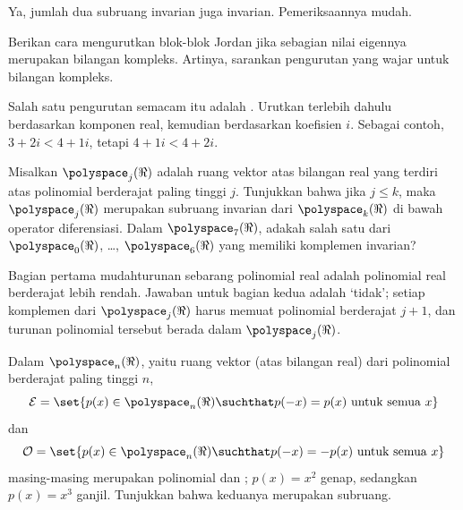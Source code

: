 \begin{exercises}
\begin{answer}
      Ya, jumlah dua subruang invarian juga invarian.
      Pemeriksaannya mudah.
    \end{answer}
  \item  \label{exer:OrderC}
     Berikan cara mengurutkan blok-blok Jordan jika sebagian nilai eigennya
     merupakan bilangan kompleks.
     Artinya, sarankan pengurutan yang wajar untuk bilangan kompleks.
     \begin{answer}
       Salah satu pengurutan semacam itu adalah .
       Urutkan terlebih dahulu berdasarkan komponen real, kemudian berdasarkan koefisien \( i \).
       Sebagai contoh, \( 3+2i<4+1i \), tetapi \( 4+1i<4+2i \).
     \end{answer}
  \item
    Misalkan \( \polyspace_j(\Re) \) adalah ruang vektor atas bilangan
    real yang terdiri atas polinomial berderajat paling tinggi \( j \).
    Tunjukkan bahwa jika \( j\le k \), maka \( \polyspace_j(\Re) \) merupakan
    subruang invarian dari \( \polyspace_k(\Re) \) di bawah operator diferensiasi.
    Dalam \( \polyspace_7(\Re) \), adakah salah satu dari \( \polyspace_0(\Re) \),
    \ldots, \( \polyspace_6(\Re) \) yang memiliki komplemen invarian?
    \begin{answer}
     Bagian pertama mudah\Dash turunan sebarang polinomial real adalah
      polinomial real berderajat lebih rendah.
      Jawaban untuk bagian kedua adalah `tidak'; setiap komplemen dari
      \( \polyspace_j(\Re) \) harus memuat polinomial berderajat \( j+1 \),
      dan turunan polinomial tersebut berada dalam \( \polyspace_j(\Re)\).
     \end{answer}
  \item
    Dalam \( \polyspace_n(\Re) \), yaitu ruang vektor (atas bilangan
    real) dari polinomial berderajat paling tinggi \( n \),
    \begin{equation*}
      \mathcal{E}=
      \set{p(x)\in\polyspace_n(\Re)\suchthat p(-x)=p(x) \text{\ untuk semua\ }x}
    \end{equation*}
    dan
    \begin{equation*}
      \mathcal{O}=
      \set{p(x)\in\polyspace_n(\Re)\suchthat p(-x)=-p(x) \text{\ untuk semua\ }x}
    \end{equation*}
    masing-masing merupakan polinomial 
    dan ;
    \( p(x)=x^2 \) genap, sedangkan \( p(x)=x^3 \) ganjil.
    Tunjukkan bahwa keduanya merupakan subruang.

\end{exercises}
